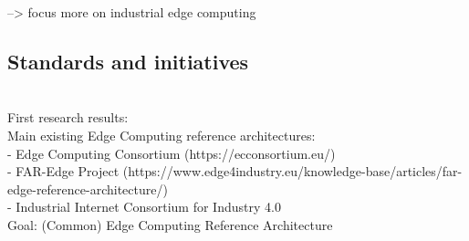  --> focus more on industrial edge computing 

\subsection{Standards and initiatives}
\\
First research results:\\
Main existing Edge Computing reference architectures:\\
- Edge Computing Consortium (https://ecconsortium.eu/)\\ 
- FAR-Edge Project (https://www.edge4industry.eu/knowledge-base/articles/far-edge-reference-architecture/)\\
- Industrial Internet Consortium for Industry 4.0\\

Goal: (Common) Edge Computing Reference Architecture